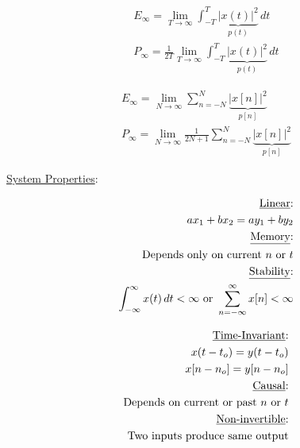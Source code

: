 \begin{multicols}{2}

  \begin{equation*}
    \begin{split}
      E_{\infty}=\lim_{T\to\infty}\int_{-T}^{T} \underbrace{|x(t)|^2}_{p(t)}\,dt\\
      P_{\infty}=\frac{1}{2T}\lim_{T\to\infty}\int_{-T}^{T} \underbrace{|x(t)|^2}_{p(t)}\,dt
    \end{split}
    \label{3}
  \end{equation*}

  \begin{equation*}
    \begin{split}
      E_{\infty}=\lim_{N\to\infty}\sum_{n=-N}^{N} \underbrace{|x[n]|^2}_{p[n]}\\
      P_{\infty}=\lim_{N\to\infty}\frac{1}{2N+1}\sum_{n=-N}^{N} \underbrace{|x[n]|^2}_{p[n]}
    \end{split}
    \label{4}
  \end{equation*}

\end{multicols}

\begin{center}
  \underline{System Properties}:
\end{center}

\vspace{-35pt}

\begin{multicols}{2}

  \begin{equation*}
    \begin{split}
      \text{\underline{Linear}:}\\
      ax_1+bx_2=ay_1+by_2\\
      \text{\underline{Memory}:}\\
      \text{Depends only on current $n$ or $t$}\\
      \text{\underline{Stability}:}\\
      \int_{-\infty}^{\infty} x(t)\,dt<\infty\text{ or }\sum_{n=-\infty}^{\infty} x[n]<\infty
    \end{split}
    \label{5}
  \end{equation*}

  \begin{equation*}
    \begin{split}
      \text{\underline{Time-Invariant}:}\\
      x(t-t_o)=y(t-t_o)\\x[n-n_o]=y[n-n_o]\\
      \text{\underline{Causal}:}\\
      \text{Depends on current or past $n$ or $t$}\\
      \text{\underline{Non-invertible}:}\\
      \text{Two inputs produce same output}\\
    \end{split}
    \label{6}
  \end{equation*}

\end{multicols}

